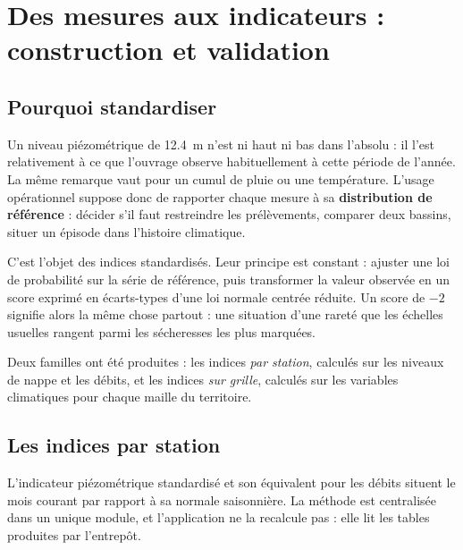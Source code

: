 \chapter{Des mesures aux indicateurs : construction et validation}
\label{ch:indicateurs}


\section{Pourquoi standardiser}

Un niveau piézométrique de \SI{12,4}{\metre} n'est ni haut ni bas dans l'absolu : il l'est
relativement à ce que l'ouvrage observe habituellement à cette période de l'année. La même
remarque vaut pour un cumul de pluie ou une température. L'usage opérationnel suppose donc de rapporter chaque mesure à sa \textbf{distribution de
référence} : décider s'il faut restreindre les prélèvements, comparer deux bassins, situer un
épisode dans l'histoire climatique.

C'est l'objet des indices standardisés. Leur principe est constant : ajuster une loi de
probabilité sur la série de référence, puis transformer la valeur observée en un score exprimé
en écarts-types d'une loi normale centrée réduite. Un score de $-2$ signifie alors la même chose
partout : une situation d'une rareté que les échelles usuelles rangent parmi les sécheresses les
plus marquées.

Deux familles ont été produites : les indices \emph{par station}, calculés sur les niveaux de
nappe et les débits, et les indices \emph{sur grille}, calculés sur les variables climatiques
pour chaque maille du territoire.

\section{Les indices par station}

L'indicateur piézométrique standardisé et son équivalent pour les débits situent le mois courant
par rapport à sa normale saisonnière. La méthode est centralisée dans un unique module, et
l'application ne la recalcule pas : elle lit les tables produites par l'entrepôt.

